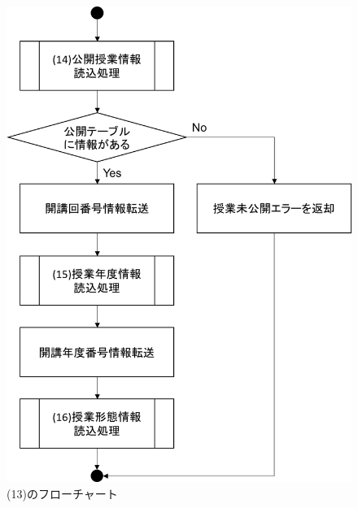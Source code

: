 \begin{figure}[htbp]
  \begin{center}
    \includegraphics[width=0.5\linewidth,clip]{./img/flow/13.png}
    \caption{(13)のフローチャート}\label{fig:13}
  \end{center}
\end{figure}



